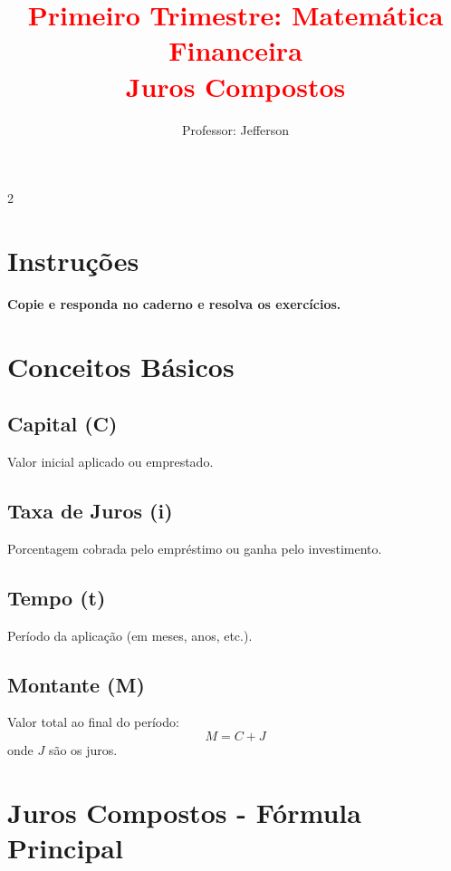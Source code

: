 \documentclass[11pt]{article}
\title{\textcolor{red}{Primeiro Trimestre: Matemática Financeira
    \\Juros Compostos}}
\author{Professor: Jefferson}
\date{}
\begin{document}
\maketitle
\vspace{-1cm}


\begin{multicols}{2}

\section*{Instruções}
    \textbf{Copie e responda no caderno e resolva os exercícios.}

\section*{Conceitos Básicos}

\subsection*{Capital (C)}
Valor inicial aplicado ou emprestado.

\subsection*{Taxa de Juros (i)}
Porcentagem cobrada pelo empréstimo ou ganha pelo investimento.

\subsection*{Tempo (t)}
Período da aplicação (em meses, anos, etc.).

\subsection*{Montante (M)}
Valor total ao final do período:
\[
M = C + J
\]
onde $J$ são os juros.

\section*{Juros Compostos - Fórmula Principal}



\end{multicols}
\end{document}
